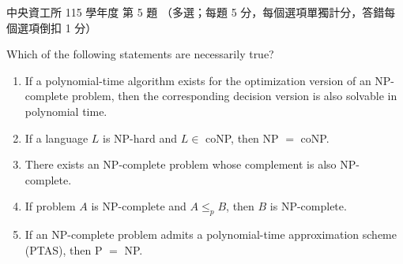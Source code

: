 \begin{pastexam}[label={px:ncu-115-dsa-05}]{中央資工所 115 學年度 第 5 題}
（多選；每題 5 分，每個選項單獨計分，答錯每個選項倒扣 1 分）

Which of the following statements are necessarily true?
\begin{enumerate}[label=\Alph*.]
\item If a polynomial-time algorithm exists for the optimization version of an NP-complete problem, then the corresponding decision version is also solvable in polynomial time.
\item If a language $L$ is NP-hard and $L\in$ coNP, then NP $=$ coNP.
\item There exists an NP-complete problem whose complement is also NP-complete.
\item If problem $A$ is NP-complete and $A\le_p B$, then $B$ is NP-complete.
\item If an NP-complete problem admits a polynomial-time approximation scheme (PTAS), then P $=$ NP.
\end{enumerate}
\end{pastexam}

